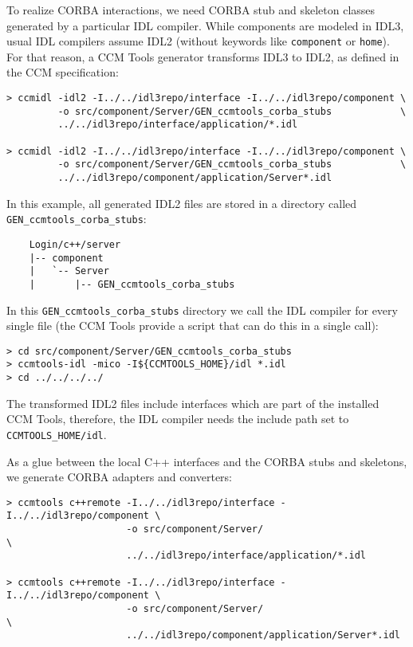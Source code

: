 \vspace{3mm}
To realize CORBA interactions, we need CORBA stub and skeleton classes 
generated by a particular IDL compiler. While components are modeled in
IDL3, usual IDL compilers assume IDL2 (without keywords like {\tt component} or 
{\tt home}).
For that reason, a CCM Tools generator transforms IDL3 to IDL2, as defined in
the CCM specification:
\begin{footnotesize}
\begin{verbatim}
> ccmidl -idl2 -I../../idl3repo/interface -I../../idl3repo/component \
         -o src/component/Server/GEN_ccmtools_corba_stubs            \  
         ../../idl3repo/interface/application/*.idl

> ccmidl -idl2 -I../../idl3repo/interface -I../../idl3repo/component \
         -o src/component/Server/GEN_ccmtools_corba_stubs            \
         ../../idl3repo/component/application/Server*.idl
\end{verbatim}
\end{footnotesize}

In this example, all generated IDL2 files are stored in a directory called 
{\tt GEN\_ccmtools\_corba\_stubs}:
\begin{footnotesize}
\begin{verbatim}
    Login/c++/server
    |-- component
    |   `-- Server
    |       |-- GEN_ccmtools_corba_stubs
\end{verbatim}
\end{footnotesize}

In this {\tt GEN\_ccmtools\_corba\_stubs} directory we call the IDL compiler for
every single file (the CCM Tools provide a script that can do this
in a single call):
\begin{footnotesize}
\begin{verbatim}
> cd src/component/Server/GEN_ccmtools_corba_stubs
> ccmtools-idl -mico -I${CCMTOOLS_HOME}/idl *.idl
> cd ../../../../
\end{verbatim}
\end{footnotesize}

The transformed IDL2 files include interfaces which are part of the
installed CCM Tools, therefore, the IDL compiler needs the include path set to
{\tt CCMTOOLS\_HOME/idl}.

\vspace{3mm}
As a glue between the local C++ interfaces and the CORBA stubs and skeletons, we
generate CORBA adapters and converters:
\begin{footnotesize}
\begin{verbatim}
> ccmtools c++remote -I../../idl3repo/interface -I../../idl3repo/component \
                     -o src/component/Server/                              \
                     ../../idl3repo/interface/application/*.idl

> ccmtools c++remote -I../../idl3repo/interface -I../../idl3repo/component \
                     -o src/component/Server/                              \
                     ../../idl3repo/component/application/Server*.idl
\end{verbatim}
\end{footnotesize}

